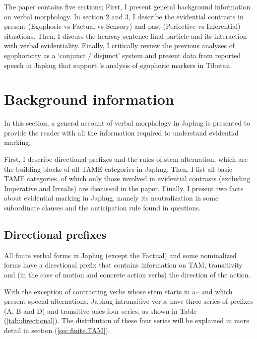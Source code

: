 \documentclass[oldfontcommands,oneside,a4paper,11pt]{article}
\newcommand{\ipa}[1]{{\phon \mbox{#1}}} %
\newcommand{\refb}[1]{(\ref{#1})}
\begin{document}
The paper contains five sections; First, I present general background information on verbal morphology. In section 2 and 3, I describe the evidential contrasts in present (Egophoric vs Factual vs Sensory) and past (Perfective vs Inferential) situations. Then, I discuss the hearsay sentence final particle and its interaction with verbal evidentiality. Finally, I critically review the previous analyses of egophoricity as a `conjunct / disjunct' system and present data from reported speech in Japhug that support \citet{tournadre08conjunct}'s analysis of egophoric markers in Tibetan.


\section{Background information}
In this section, a general account of verbal morphology in Japhug is presented to provide the reader with all the information required to understand evidential marking.

First, I describe directional prefixes and the rules of stem alternation, which are the building blocks of all TAME categories in Japhug. Then, I list all basic TAME categories, of which only those involved in evidential contrasts (excluding Imperative and Irrealis) are discussed in the paper. Finally, I present two facts about evidential marking in Japhug, namely its neutralization in some subordinate clauses and the anticipation rule found in questions.

\subsection{Directional prefixes} \label{sec:directional}
All finite verbal forms in Japhug (except the Factual) and some nominalized forms have a directional prefix that contains information on TAM, transitivity and  (in the case of motion and concrete action verbs) the direction of the action.

With the exception of contracting verbs whose stem starts in \ipa{a--} and which present special alternations, Japhug intransitive verbs have three series of prefixes (A, B and D) and transitive ones four series, as shown in Table \refb{tab:directional}. The distribution of these four series will be explained in more detail in section \refb{sec:finite.TAM}.
\end{document}

